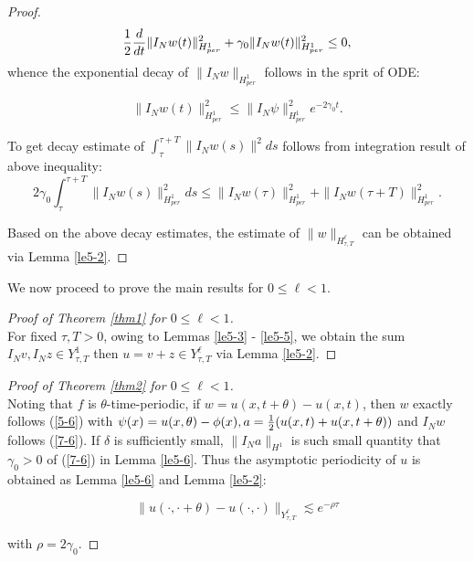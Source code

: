 \documentclass[10pt,a4paper,final]{article}
\numberwithin{equation}{section}
\begin{document}
\begin{proof}
$${1\over 2}{d\over dt}\|I_Nw(t)\|^2_{H_{per}^1}+\gamma_0\|I_Nw(t)\|_{H_{per}^1}^2\le 0,$$
whence the exponential decay of $\|I_Nw\|_{H_{per}^1}$ follows in the sprit of ODE:

\begin{equation}\label{5-9}
\|I_Nw(t)\|_{H_{per}^1}^2\le\|I_N\psi\|_{H_{per}^1}^2e^{-2\gamma_0t}.
\end{equation}

To get decay estimate of $\int_{\tau}^{\tau+T}\|I_Nw(s)\|^2ds$ follows from integration result of above inequality: 
$$2\gamma_0\int_{\tau}^{\tau+T}\|I_Nw(s)\|_{H_{per}^1}^2ds\le \|I_Nw(\tau)\|_{H_{per}^1}^2+\|I_Nw(\tau+T)\|_{H_{per}^1}^2.$$

Based on the above decay estimates, the estimate of $\|w\|_{H^\ell_{\tau, T}}$ can be obtained via Lemma \ref{le5-2}. 
\end{proof}

We now proceed to prove the main results for $0 \le \ell < 1$. \\

\begin{proof} [Proof of Theorem \ref{thm1} for $0\le\ell<1$] \ \\
For fixed $\tau, T>0$, owing to Lemmas \ref{le5-3} - \ref{le5-5}, we obtain the sum $I_Nv, I_Nz\in Y^{1}_{\tau, T}$ then $u = v+z \in Y^\ell_{\tau, T}$ via Lemma \ref{le5-2}. 
\end{proof}

\begin{proof}[Proof of Theorem \ref{thm2} for $0\le\ell<1$]\ \\
Noting that $f$ is $\theta$-time-periodic, if $w = u(x, t+\theta)-u(x,t)$, then $w$ exactly follows (\ref{5-6}) with $\psi(x) = u(x, \theta)-\phi(x), a={1\over 2}(u(x,t)+u(x, t+\theta))$ and $I_Nw$ follows (\ref{7-6}). If $\delta$ is sufficiently small, $\|I_Na\|_{H^1}$ is such small quantity that $\gamma_0>0$ of (\ref{7-6}) in Lemma \ref{le5-6}. Thus the asymptotic periodicity of $u$ is obtained as Lemma \ref{le5-6} and Lemma \ref{le5-2}:

$$\|u(\cdot, \cdot+\theta)-u(\cdot, \cdot)\|_{Y^{\ell}_{\tau, T}}\lesssim e^{-\rho\tau}$$

with $\rho=2\gamma_0.$
\end{proof}
\end{document}
